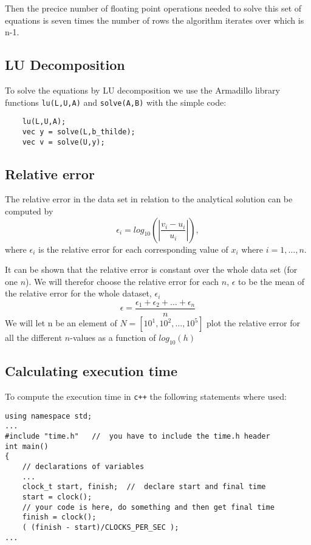\documentclass[11pt,a4wide]{article}
\begin{document}
Then the precice number of floating point operations needed to solve this set of equations is seven times the number of rows the algorithm iterates over which is n-1. 

\subsection{LU Decomposition}
To solve the equations by LU decomposition we use the Armadillo library functions \texttt{lu(L,U,A)} and \texttt{solve(A,B)} with the simple code:
\begin{lstlisting}
    lu(L,U,A);
    vec y = solve(L,b_thilde);
    vec v = solve(U,y);
\end{lstlisting}





\subsection{Relative error}
The relative error in the data set in relation to the analytical solution can be computed by 
\[
   \epsilon_i=log_{10}\left(\left|\frac{v_i-u_i}
                 {u_i}\right|\right),
\]
where $\epsilon_i$ is the relative error for each corresponding value of $x_i$ where $i=1,\dots, n$. 

It can be shown that the relative error is constant over the whole data set (for one $n$). We will therefor choose the relative error for each $n$, $\epsilon$ to be the mean of the relative error for the whole dataset, $\epsilon_i$
\[
\epsilon = \frac{\epsilon_1 + \epsilon_2 + \dots + \epsilon_n}{n}
\]
We will let n be an element of $N = [10^1, 10^2, \dots, 10^5]$ plot the relative error for all the different $n$-values as a function of $log_{10}(h)$ 

\subsection{Calculating execution time}
To compute the execution time in \texttt{c++} the following statements where used:
\begin{lstlisting}[title={Time in C++}]
using namespace std;
...
#include "time.h"   //  you have to include the time.h header
int main()
{
    // declarations of variables 
    ...
    clock_t start, finish;  //  declare start and final time
    start = clock();
    // your code is here, do something and then get final time
    finish = clock();
    ( (finish - start)/CLOCKS_PER_SEC );
...
\end{lstlisting}
\end{document}
